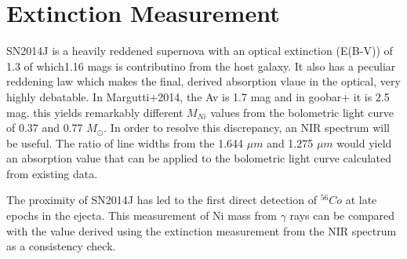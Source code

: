 \documentclass{article}
\begin{document}
\section{Extinction Measurement}
SN2014J is a heavily reddened supernova with an optical extinction (E(B-V)) of 1.3 of which1.16 mags is contributino from the host galaxy. It also has a peculiar reddening law which makes the final, derived absorption vlaue in the optical, very highly debatable. In Margutti+2014, the Av is 1.7 mag and in goobar+ it is 2.5 mag. this yields remarkably different $M_{Ni}$ values from the bolometric light curve of 0.37 and 0.77 $M_{\odot}$. In order to resolve this discrepancy, an NIR spectrum will be useful. The ratio of line widths from the 1.644 $\mu m$ and 1.275 $\mu m$ would yield an absorption value that can be applied to the bolometric light curve calculated from existing data. 

The proximity of SN2014J has led to the first direct detection of $^{56}Co$ at late epochs in the ejecta. This measurement of Ni mass from $\gamma$ rays can be compared with the value derived using the extinction measurement from the NIR spectrum as a consistency check.

 
\end{document}
